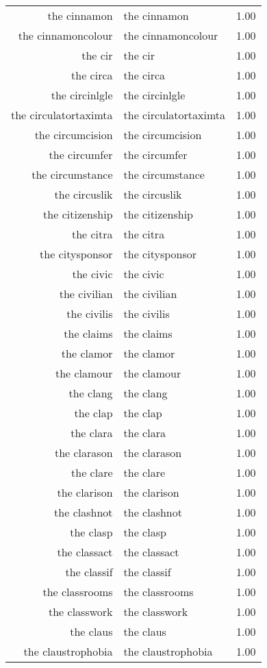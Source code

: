 \begin{table}[ht]
\begin{tabular}{rlr}
  the cinnamon & the cinnamon & 1.00 \\ 
  the cinnamoncolour & the cinnamoncolour & 1.00 \\ 
  the cir & the cir & 1.00 \\ 
  the circa & the circa & 1.00 \\ 
  the circinlgle & the circinlgle & 1.00 \\ 
  the circulatortaximta & the circulatortaximta & 1.00 \\ 
  the circumcision & the circumcision & 1.00 \\ 
  the circumfer & the circumfer & 1.00 \\ 
  the circumstance & the circumstance & 1.00 \\ 
  the circuslik & the circuslik & 1.00 \\ 
  the citizenship & the citizenship & 1.00 \\ 
  the citra & the citra & 1.00 \\ 
  the citysponsor & the citysponsor & 1.00 \\ 
  the civic & the civic & 1.00 \\ 
  the civilian & the civilian & 1.00 \\ 
  the civilis & the civilis & 1.00 \\ 
  the claims & the claims & 1.00 \\ 
  the clamor & the clamor & 1.00 \\ 
  the clamour & the clamour & 1.00 \\ 
  the clang & the clang & 1.00 \\ 
  the clap & the clap & 1.00 \\ 
  the clara & the clara & 1.00 \\ 
  the clarason & the clarason & 1.00 \\ 
  the clare & the clare & 1.00 \\ 
  the clarison & the clarison & 1.00 \\ 
  the clashnot & the clashnot & 1.00 \\ 
  the clasp & the clasp & 1.00 \\ 
  the classact & the classact & 1.00 \\ 
  the classif & the classif & 1.00 \\ 
  the classrooms & the classrooms & 1.00 \\ 
  the classwork & the classwork & 1.00 \\ 
  the claus & the claus & 1.00 \\ 
  the claustrophobia & the claustrophobia & 1.00 \\ 

\end{tabular}
\end{table}
